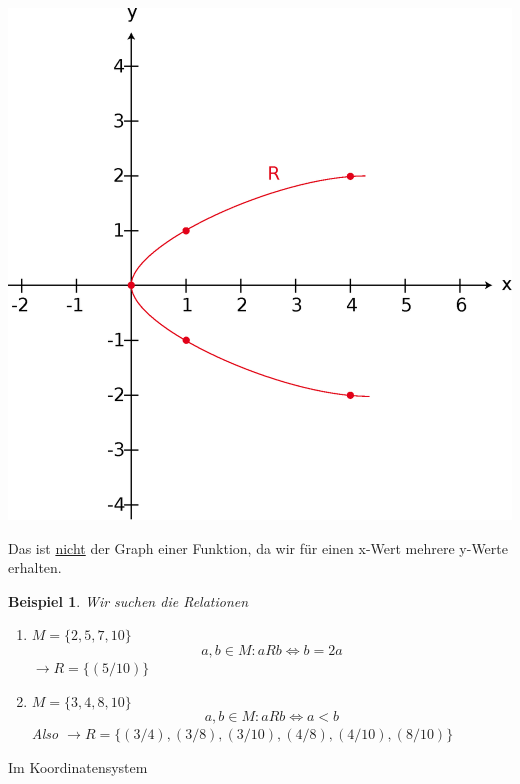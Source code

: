 \documentclass{report}
\newtheorem{myexample}{Beispiel}
\begin{document}
\begin{center}\includegraphics[scale=0.25]{img/3-relation-not-function.eps}\end{center}
Das ist \underline{nicht} der Graph einer Funktion, da wir für einen x-Wert mehrere y-Werte erhalten.
\begin{myexample}Wir suchen die Relationen\begin{enumerate}
\item $M = \{2, 5, 7, 10\}$\\
\begin{equation}a,b \in M : a R b \iff b = 2a\end{equation}
$\to R = \{(5/10)\}$
\item $M = \{3,4,8,10\}$\\
\begin{equation}a,b \in M : a R b \iff a < b\end{equation}
Also
$\to R = \{(3/4),(3/8),(3/10),(4/8),(4/10),(8/10)\}$\end{enumerate}\end{myexample}
Im Koordinatensystem
\end{document}
